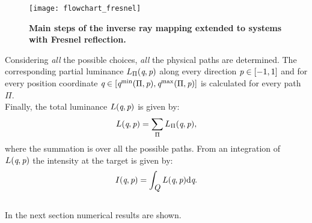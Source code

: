 \begin{figure}[t]
  \begin{center}
  \texttt{[image: flowchart\_fresnel]}
  \end{center}
  \caption{\textbf{Main steps of the inverse ray mapping extended to systems with Fresnel reflection.}}
\label{fig:flowchart_fresnel}
 \end{figure}
Considering \textit{all} the possible choices, \textit{all} the physical paths are determined. The corresponding partial luminance $L_{\Pi}(\textit{q}, \textit{p})$ along every direction $\textit{p}\in [-1,1]$ and for every position coordinate $\textit{q}\in[\textit{q}^{\textrm{min}}(\Pi, \textit{p}), \textit{q}^{\textrm{max}}(\Pi, \textit{p})]$ is calculated for every path $\Pi$. 
\\ \indent Finally, the total luminance $L(\textit{q}, \textit{p})$ is given by:
\begin{equation}\label{eq:luminance_fresnel}
L(\textit{q}, \textit{p}) = \sum_{\Pi}L_{\Pi}(\textit{q}, \textit{p}),
\end{equation} 
where the summation is over all the possible paths. 
From an integration of $L(\textit{q}, \textit{p})$ the intensity at the target is given by:
\begin{equation}\label{eq:intensity_fresnel}
I(\textit{q}, \textit{p}) = \int_{\mbox{$\emph{Q}_{\textit{}}$}}L(\textit{q}, \textit{p})\textrm{d}\textit{q}.
\end{equation}
\\ \indent In the next section numerical results are shown.
